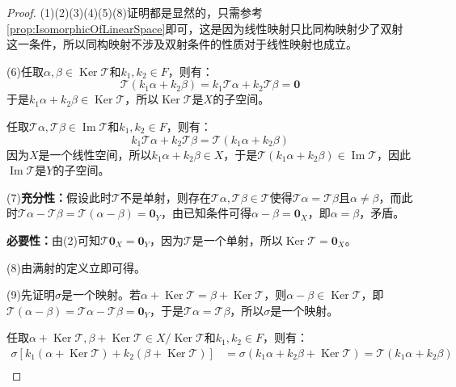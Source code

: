\begin{proof}
	(1)(2)(3)(4)(5)(8)证明都是显然的，只需参考\cref{prop:IsomorphicOfLinearSpace}即可，这是因为线性映射只比同构映射少了双射这一条件，所以同构映射不涉及双射条件的性质对于线性映射也成立。\par
	(6)任取$\alpha,\beta\in\operatorname{Ker}\mathcal{T}$和$k_1,k_2\in F$，则有：
	\begin{equation*}
		\mathcal{T}(k_1\alpha+k_2\beta)=k_1\mathcal{T}\alpha+k_2\mathcal{T}\beta=\mathbf{0}
	\end{equation*}
	于是$k_1\alpha+k_2\beta\in\operatorname{Ker}\mathcal{T}$，所以$\operatorname{Ker}\mathcal{T}$是$X$的子空间。\par
	任取$\mathcal{T}\alpha,\mathcal{T}\beta\in\operatorname{Im}\mathcal{T}$和$k_1,k_2\in F$，则有：
	\begin{equation*}
		k_1\mathcal{T}\alpha+k_2\mathcal{T}\beta=\mathcal{T}(k_1\alpha+k_2\beta)
	\end{equation*}
	因为$X$是一个线性空间，所以$k_1\alpha+k_2\beta\in X$，于是$\mathcal{T}(k_1\alpha+k_2\beta)\in\operatorname{Im}\mathcal{T}$，因此$\operatorname{Im}\mathcal{T}$是$Y$的子空间。\par
	(7)\textbf{充分性：}假设此时$\mathcal{T}$不是单射，则存在$\mathcal{T}\alpha,\mathcal{T}\beta\in\mathcal{T}$使得$\mathcal{T}\alpha=\mathcal{T}\beta$且$\alpha\ne\beta$，而此时$\mathcal{T}\alpha-\mathcal{T}\beta=\mathcal{T}(\alpha-\beta)=\mathbf{0}_Y$，由已知条件可得$\alpha-\beta=\mathbf{0}_X$，即$\alpha=\beta$，矛盾。\par
	\textbf{必要性：}由(2)可知$\mathcal{T}\mathbf{0}_X=\mathbf{0}_Y$，因为$\mathcal{T}$是一个单射，所以$\operatorname{Ker}\mathcal{T}=\mathbf{0}_X$。\par
	(8)由满射的定义立即可得。\par
	(9)先证明$\sigma$是一个映射。若$\alpha+\operatorname{Ker}\mathcal{T}=\beta+\operatorname{Ker}\mathcal{T}$，则$\alpha-\beta\in\operatorname{Ker}\mathcal{T}$，即$\mathcal{T}(\alpha-\beta)=\mathcal{T}\alpha-\mathcal{T}\beta=\mathbf{0}_Y$，于是$\mathcal{T}\alpha=\mathcal{T}\beta$，所以$\sigma$是一个映射。\par
	任取$\alpha+\operatorname{Ker}\mathcal{T},\beta+\operatorname{Ker}\mathcal{T}\in X/\operatorname{Ker}\mathcal{T}$和$k_1,k_2\in F$，则有：
	\begin{align*}
		\sigma[k_1(\alpha+\operatorname{Ker}\mathcal{T})+k_2(\beta+\operatorname{Ker}\mathcal{T})]
		&=\sigma(k_1\alpha+k_2\beta+\operatorname{Ker}\mathcal{T})
		=\mathcal{T}(k_1\alpha+k_2\beta) \\

\end{align*}
\end{proof}
